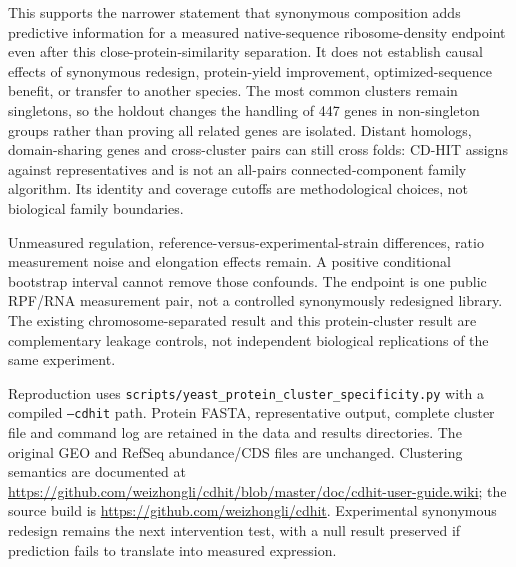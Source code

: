This supports the narrower statement that synonymous composition adds predictive information for a measured native-sequence ribosome-density endpoint even after this close-protein-similarity separation. It does not establish causal effects of synonymous redesign, protein-yield improvement, optimized-sequence benefit, or transfer to another species. The most common clusters remain singletons, so the holdout changes the handling of 447 genes in non-singleton groups rather than proving all related genes are isolated. Distant homologs, domain-sharing genes and cross-cluster pairs can still cross folds: CD-HIT assigns against representatives and is not an all-pairs connected-component family algorithm. Its identity and coverage cutoffs are methodological choices, not biological family boundaries.

Unmeasured regulation, reference-versus-experimental-strain differences, ratio measurement noise and elongation effects remain. A positive conditional bootstrap interval cannot remove those confounds. The endpoint is one public RPF/RNA measurement pair, not a controlled synonymously redesigned library. The existing chromosome-separated result and this protein-cluster result are complementary leakage controls, not independent biological replications of the same experiment.

Reproduction uses \texttt{scripts/yeast\_protein\_cluster\_specificity.py} with a compiled \texttt{--cdhit} path. Protein FASTA, representative output, complete cluster file and command log are retained in the data and results directories. The original GEO and RefSeq abundance/CDS files are unchanged. Clustering semantics are documented at \url{https://github.com/weizhongli/cdhit/blob/master/doc/cdhit-user-guide.wiki}; the source build is \url{https://github.com/weizhongli/cdhit}. Experimental synonymous redesign remains the next intervention test, with a null result preserved if prediction fails to translate into measured expression.




